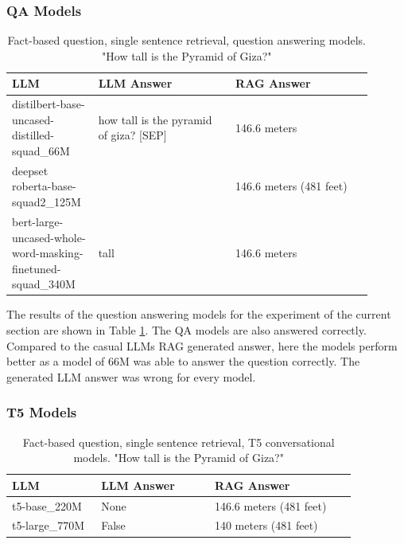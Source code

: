 \documentclass{wseas}
\begin{document}
\subsubsection{QA Models}

\begin{table}[htbp]
  \centering
  \caption{Fact-based question, single sentence retrieval, question answering models. "How tall is the Pyramid of Giza?"} %
  \label{tab:experiment_R_1_sentence_Q_fact_M_question_answering_table}  %
    \begin{tabular}{|p{0.2\linewidth}|p{0.35\linewidth}|p{0.35\linewidth}|}
      \hline
      \textbf{LLM} & \textbf{LLM Answer} & \textbf{RAG Answer} \\ \hline
      distilbert-base-uncased-distilled-squad\_66M & how tall is the pyramid of giza? {[}SEP{]} & 146.6 meters \\ \hline
      deepset roberta-base-squad2\_125M &  & 146.6 meters (481 feet) \\ \hline
      bert-large-uncased-whole-word-masking-finetuned-squad\_340M & tall & 146.6 meters \\ \hline
    \end{tabular}
\end{table}
The results of the question answering models for the experiment of the 
current section are shown in Table \ref{tab:experiment_R_1_sentence_Q_fact_M_question_answering_table}.
The QA models are also answered correctly. Compared to the casual LLMs
RAG generated answer, here the models perform better as a model of 66M
was able to answer the question correctly. The generated LLM answer was
wrong for every model.

\subsubsection{T5 Models}

\begin{table}[htbp]
  \centering
  \caption{Fact-based question, single sentence retrieval, T5 conversational models. "How tall is the Pyramid of Giza?"} %
  \label{tab:experiment_R_1_sentence_Q_fact_M_T5_table}  %
  \begin{tabular}{|p{0.22\linewidth}|p{0.29\linewidth}|p{0.35\linewidth}|}
    \hline
    \textbf{LLM} & \textbf{LLM Answer} & \textbf{RAG Answer} \\ \hline
    t5-base\_220M & None & 146.6 meters (481 feet) \\ \hline
    t5-large\_770M & False & 140 meters (481 feet) \\ \hline
  \end{tabular}
\end{table}
\end{document}
